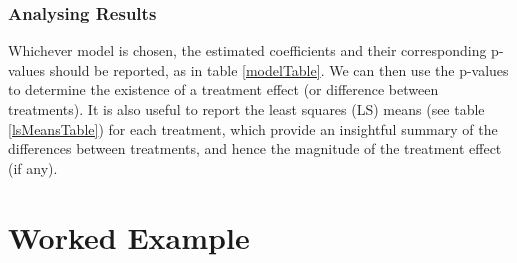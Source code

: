 \documentclass[12pt, TexShade, letterpaper]{report}
\begin{document}
\subsection{Analysing Results}
Whichever model is chosen, the estimated coefficients and their corresponding p-values should be reported, as in table \ref{modelTable}. We can then use the p-values to determine the existence of a treatment effect (or difference between treatments). It is also useful to report the least squares (LS) means (see table \ref{lsMeansTable}) for each treatment, which provide an insightful summary of the differences between treatments, and hence the magnitude of the treatment effect (if any).




\chapter{Worked Example} \label{example}

	{
	
	
	
	
	}
	
\end{document}

